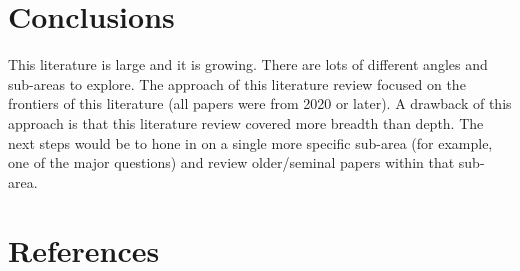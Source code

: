 \documentclass{article}
\begin{document}
\section*{Conclusions}

This literature is large and it is growing.  There are lots of different angles and sub-areas to explore. The approach of this literature review focused on the frontiers of this literature (all papers were from 2020 or later). A drawback of this approach is that this literature review covered more breadth than depth. The next steps would be to hone in on a single more specific sub-area (for example, one of the major questions) and review older/seminal papers within that sub-area.


\section{References}
\end{document}
